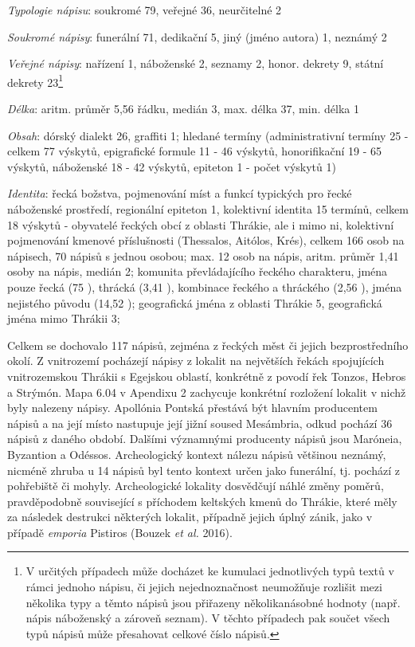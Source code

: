 {\em Typologie nápisu}: soukromé 79, veřejné 36, neurčitelné 2

{\em Soukromé nápisy}: funerální 71, dedikační 5, jiný (jméno autora) 1, neznámý 2

{\em Veřejné nápisy}: nařízení 1, náboženské 2, seznamy 2, honor. dekrety 9, státní dekrety 23\footnote{V určitých případech může docházet ke kumulaci jednotlivých typů textů v rámci jednoho nápisu, či jejich nejednoznačnost neumožňuje rozlišit mezi několika typy a těmto nápisů jsou přiřazeny několikanásobné hodnoty (např. nápis náboženský a zároveň seznam). V těchto případech pak součet všech typů nápisů může přesahovat celkové číslo nápisů.}

{\em Délka}: aritm. průměr 5,56 řádku, medián 3, max. délka 37, min. délka 1

{\em Obsah}: dórský dialekt 26, graffiti 1; hledané termíny (administrativní termíny 25 - celkem 77 výskytů, epigrafické formule 11 - 46 výskytů, honorifikační 19 - 65 výskytů, náboženské 18 - 42 výskytů, epiteton 1 - počet výskytů 1)

{\em Identita}: řecká božstva, pojmenování míst a funkcí typických pro řecké náboženské prostředí, regionální epiteton 1, kolektivní identita 15 termínů, celkem 18 výskytů - obyvatelé řeckých obcí z oblasti Thrákie, ale i mimo ni, kolektivní pojmenování kmenové příslušnosti (Thessalos, Aitólos, Krés), celkem 166 osob na nápisech, 70 nápisů s jednou osobou; max. 12 osob na nápis, aritm. průměr 1,41 osoby na nápis, medián 2; komunita převládajícího řeckého charakteru, jména pouze řecká (75 ), thrácká (3,41 ), kombinace řeckého a thráckého (2,56 ), jména nejistého původu (14,52 ); geografická jména z oblasti Thrákie 5, geografická jména mimo Thrákii 3;

\NC\AR
\HL
\HL
\stoptable

Celkem se dochovalo 117 nápisů, zejména z řeckých měst či jejich bezprostředního okolí. Z vnitrozemí pocházejí nápisy z lokalit na největších řekách spojujících vnitrozemskou Thrákii s Egejskou oblastí, konkrétně z povodí řek Tonzos, Hebros a Strýmón. Mapa 6.04 v Apendixu 2 zachycuje konkrétní rozložení lokalit v nichž byly nalezeny nápisy. Apollónia Pontská přestává být hlavním producentem nápisů a na její místo nastupuje její jižní soused Mesámbria, odkud pochází 36  nápisů z daného období. Dalšími významnými producenty nápisů jsou Maróneia, Byzantion a Odéssos. Archeologický kontext nálezu nápisů většinou neznámý, nicméně zhruba u 14 nápisů byl tento kontext určen jako funerální, tj. pochází z pohřebiště či mohyly. Archeologické lokality dosvědčují náhlé změny poměrů, pravděpodobně související s příchodem keltských kmenů do Thrákie, které měly za následek destrukci některých lokalit, případně jejich úplný zánik, jako v případě {\em emporia} Pistiros (Bouzek {\em et al.} 2016).

